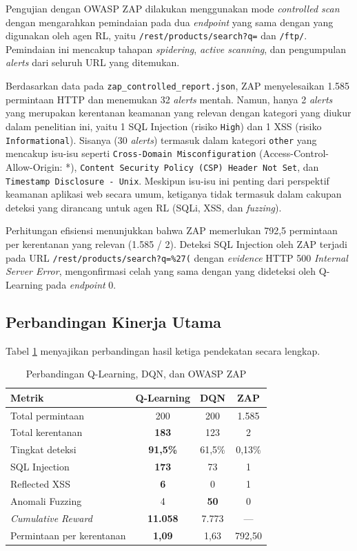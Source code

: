 Pengujian dengan OWASP ZAP dilakukan menggunakan mode \textit{controlled scan} dengan mengarahkan pemindaian pada dua \textit{endpoint} yang sama dengan yang digunakan oleh agen RL, yaitu \texttt{/rest/products/search?q=} dan \texttt{/ftp/}. Pemindaian ini mencakup tahapan \textit{spidering}, \textit{active scanning}, dan pengumpulan \textit{alerts} dari seluruh URL yang ditemukan.

Berdasarkan data pada \texttt{zap\_controlled\_report.json}, ZAP menyelesaikan 1.585 permintaan HTTP dan menemukan 32 \textit{alerts} mentah. Namun, hanya 2 \textit{alerts} yang merupakan kerentanan keamanan yang relevan dengan kategori yang diukur dalam penelitian ini, yaitu 1 SQL Injection (risiko \texttt{High}) dan 1 XSS (risiko \texttt{Informational}). Sisanya (30 \textit{alerts}) termasuk dalam kategori \texttt{other} yang mencakup isu-isu seperti \texttt{Cross-Domain Misconfiguration} (Access-Control-Allow-Origin: *), \texttt{Content Security Policy (CSP) Header Not Set}, dan \texttt{Timestamp Disclosure - Unix}. Meskipun isu-isu ini penting dari perspektif keamanan aplikasi web secara umum, ketiganya tidak termasuk dalam cakupan deteksi yang dirancang untuk agen RL (SQLi, XSS, dan \textit{fuzzing}).

Perhitungan efisiensi menunjukkan bahwa ZAP memerlukan 792,5 permintaan per kerentanan yang relevan (1.585 / 2). Deteksi SQL Injection oleh ZAP terjadi pada URL \texttt{/rest/products/search?q=\%27(} dengan \textit{evidence} HTTP 500 \textit{Internal Server Error}, mengonfirmasi celah yang sama dengan yang dideteksi oleh Q-Learning pada \textit{endpoint} 0.

\subsection{Perbandingan Kinerja Utama}

Tabel \ref{tab:comparison} menyajikan perbandingan hasil ketiga pendekatan secara lengkap.

\begin{table}[H]
\centering
\caption{Perbandingan Q-Learning, DQN, dan OWASP ZAP}
\label{tab:comparison}
\begin{tabular}{|l|c|c|c|}
\hline
\textbf{Metrik} & \textbf{Q-Learning} & \textbf{DQN} & \textbf{ZAP} \\
\hline
Total permintaan & 200 & 200 & 1.585 \\
Total kerentanan & \textbf{183} & 123 & 2 \\
Tingkat deteksi & \textbf{91,5\%} & 61,5\% & 0,13\% \\
SQL Injection & \textbf{173} & 73 & 1 \\
Reflected XSS & \textbf{6} & 0 & 1 \\
Anomali Fuzzing & 4 & \textbf{50} & 0 \\
\textit{Cumulative Reward} & \textbf{11.058} & 7.773 & --- \\
Permintaan per kerentanan & \textbf{1,09} & 1,63 & 792,50 \\
\hline
\end{tabular}
\end{table}

